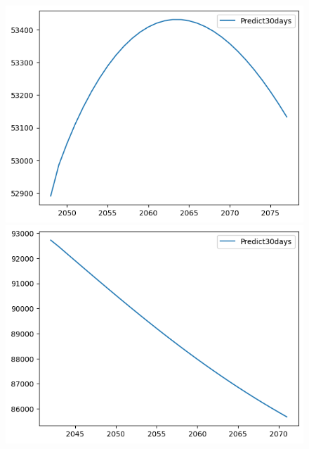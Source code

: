 \begin{figure}[H]
\begin{minipage}{0.15\textwidth}
    \centering
    \includegraphics[width=1\textwidth]{resources/chapter-5/predicted/BIDV_GRU_9-1_30days.png}
    \end{minipage}
    \hfill
    \begin{minipage}{0.15\textwidth}
    \centering
    \includegraphics[width=1\textwidth]{resources/chapter-5/predicted/VCB_GRU_7-3_30days.png}
    \end{minipage}
    \hfill
    \begin{minipage}{0.15\textwidth}
    \centering

\end{minipage}
\end{figure}
